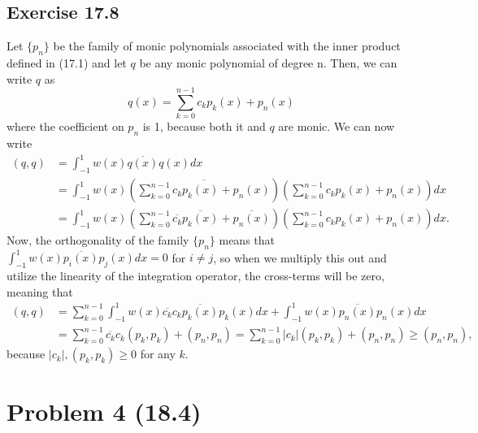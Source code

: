 \documentclass{article}
\begin{document}
\subsection{Exercise 17.8}
Let $\{p_n\}$ be the family of monic polynomials associated with the inner product defined in (17.1) and let $q$ be any monic polynomial of degree n. Then, we can write $q$ as 
\[
q(x)=\sum_{k=0}^{n-1}c_kp_k(x)+p_n(x) 
\]
where the coefficient on $p_n$ is 1, because both it and $q$ are monic. We can now write
\begin{align*}
(q,q)&=\int_{-1}^1w(x)\overline{q(x)}q(x)dx\\&=\int_{-1}^1w(x)\left(\overline{\sum_{k=0}^{n-1}c_kp_k(x)+p_n(x)}\right)\left(\sum_{k=0}^{n-1}c_kp_k(x)+p_n(x)\right)dx\\&=
\int_{-1}^1w(x)\left(\sum_{k=0}^{n-1}\overline{c_k}\overline{p_k(x)}+\overline{p_n(x)}\right)\left(\sum_{k=0}^{n-1}c_kp_k(x)+p_n(x)\right)dx.
\end{align*}
Now, the orthogonality of the family $\{p_n\}$ means that $\int_{-1}^1w(x)\overline{p_i(x)}p_j(x)dx=0$ for $i\neq j$, so when we multiply this out and utilize the linearity of the integration operator, the cross-terms will be zero, meaning that 
\begin{align*}
(q,q)&=\sum_{k=0}^{n-1}\int_{-1}^1w(x)\overline{c_k}c_k\overline{p_k(x)}p_k(x)dx+\int_{-1}^1w(x)\overline{p_n(x)}p_n(x)dx\\&=
\sum_{k=0}^{n-1}\overline{c_k}c_k(p_k,p_k)+(p_n,p_n)=\sum_{k=0}^{n-1}|c_k|(p_k,p_k)+(p_n,p_n)\geq(p_n,p_n),
\end{align*}
because $|c_k|,(p_k,p_k)\geq0$ for any $k$.

\section{Problem 4 (18.4)}
\end{document}
